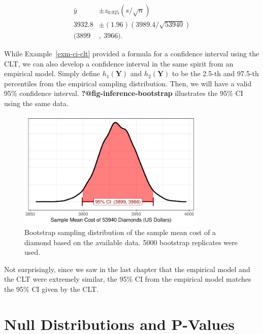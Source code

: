 \documentclass[
  letterpaper,
  DIV=11,
  numbers=noendperiod]{scrreprt}
\theoremstyle{definition}
\theoremstyle{definition}
\theoremstyle{plain}
\theoremstyle{remark}
\begin{document}
\[
\begin{aligned}
  \bar{y} &\pm z_{0.925} \left(s / \sqrt{n}\right) \\
  3932.8 &\pm (1.96) (3989.4 / \sqrt{53940}) \\
  (3899&,\ 3966).
\end{aligned}
\]

While Example~\ref{exm-ci-clt} provided a formula for a confidence
interval using the CLT, we can also develop a confidence interval in the
same spirit from an empirical model. Simply define \(h_1(\mathbf{Y})\)
and \(h_2(\mathbf{Y})\) to be the 2.5-th and 97.5-th percentiles from
the empirical sampling distribution. Then, we will have a valid 95\%
confidence interval. \textbf{?@fig-inference-bootstrap} illustrates the
95\% CI using the same data.

\begin{figure}

{\centering \includegraphics[width=0.8\textwidth,height=\textheight]{./images/fig-samplingdistributions-bootstrap-1.pdf}

}

\caption{\label{fig-samplingdistributions-bootstrap}Bootstrap sampling
distribution of the sample mean cost of a diamond based on the available
data. 5000 bootstrap replicates were used.}

\end{figure}

Not surprisingly, since we saw in the last chapter that the empirical
model and the CLT were extremely similar, the 95\% CI from the empirical
model matches the 95\% CI given by the CLT.

\hypertarget{null-distributions-and-p-values}{%
\section{Null Distributions and
P-Values}\label{null-distributions-and-p-values}}
\end{document}
